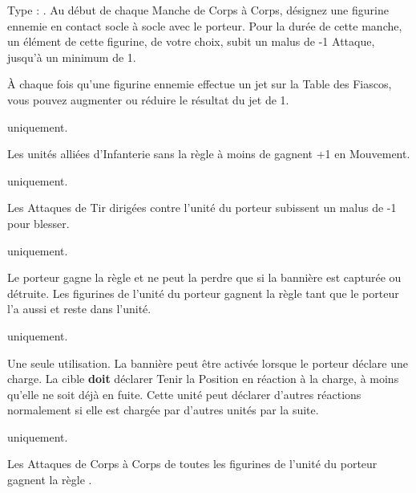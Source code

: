 \startpricelist

Type : \shield{}. Au début de chaque Manche de Corps à Corps, désignez une figurine ennemie en contact socle à socle avec le porteur. Pour la durée de cette manche, un élément de cette figurine, de votre choix, subit un malus de -1 Attaque, jusqu'à un minimum de 1.

\endpricelist

\armyarcaneitems

\startpricelist

À chaque fois qu'une figurine ennemie effectue un jet sur la Table des Fiascos, vous pouvez augmenter ou réduire le résultat du jet de 1.

\endpricelist

\armymagicalbanners

\startpricelist

 \infantry{} uniquement.

Les unités alliées d'Infanterie sans la règle \skirmisher{} à moins de  gagnent +1 en Mouvement.

 \textbf{\dchange} uniquement.

Les Attaques de Tir dirigées contre l'unité du porteur subissent un malus de -1 pour blesser.

 \textbf{\wrath} uniquement.

Le porteur gagne la règle \frenzy{} et ne peut la perdre que si la bannière est capturée ou détruite. Les figurines de l'unité du porteur gagnent la règle \frenzy{} tant que le porteur l'a aussi et reste dans l'unité.

 \textbf{\dlust} uniquement.

Une seule utilisation. La bannière peut être activée lorsque le porteur déclare une charge. La cible \textbf{doit} déclarer Tenir la Position en réaction à la charge, à moins qu'elle ne soit déjà en fuite. Cette unité peut déclarer d'autres réactions normalement si elle est chargée par d'autres unités par la suite.

 \textbf{\pestilence} uniquement.

Les Attaques de Corps à Corps de toutes les figurines de l'unité du porteur gagnent la règle \poisonedattacks{}.

\endpricelist

